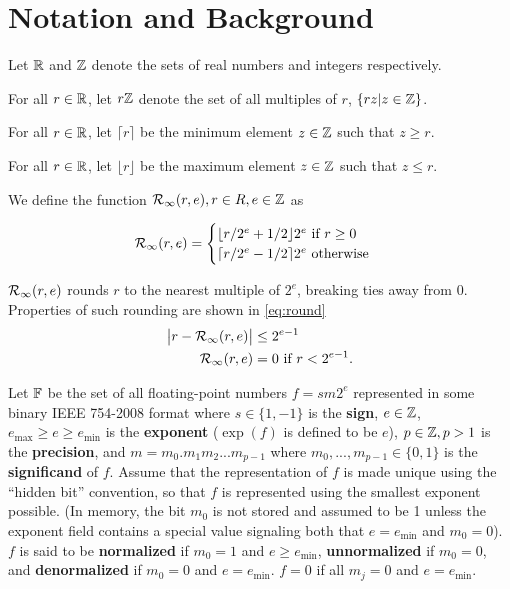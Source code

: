 \section{Notation and Background}
  Let $\mathbb{R}$ and $\mathbb{Z}$ denote the sets of real numbers and integers respectively.

  For all $r \in \mathbb{R}$, let $r\mathbb{Z}$ denote the set of all multiples of $r$, $\{rz | z \in \mathbb{Z}\}$.

  For all $r \in \mathbb{R}$, let $\lceil r \rceil$ be the minimum element $z \in \mathbb{Z}$
  such that $z \geq r$.

  For all $r \in \mathbb{R}$, let $\lfloor r \rfloor$ be the maximum element $z \in \mathbb{Z}$
  such that $z \leq r$.

  We define the function $\mathcal{R}_\text{$\infty$}(r, e), r \in R, e \in \mathbb{Z}$ as

  \begin{equation}
    \mathcal{R}_\text{$\infty$}(r, e) = \begin{cases}
        \lfloor r/2^e + 1/2 \rfloor 2^e \text{ if } r \geq 0\\
        \lceil r/2^e - 1/2 \rceil 2^e \text{ otherwise}
    \end{cases}
  \end{equation}

  $\mathcal{R}_\text{$\infty$}(r, e)$ rounds $r$ to the nearest multiple of $2^e$,
  breaking ties away from 0. Properties of such rounding are shown in
  \eqref{eq:round}
  \begin{equation}
    \begin{aligned}
    \bigl|r - \mathcal{R}_\text{$\infty$}(r, e)\bigr| & \leq 2^{e - 1} \\
    \mathcal{R}_\text{$\infty$}(r,e) & = 0 \text{ if } r < 2^{e-1}.
    \end{aligned}
    \label{eq:round}
  \end{equation}

  Let $\mathbb{F}$ be the set of all floating-point numbers $f = sm2^e$ represented in some binary IEEE 754-2008 format \cite{ieee754} where $s \in \{1, -1\}$ is the \textbf{sign},
  $e \in \mathbb{Z}$, $e_{\max} \geq e \geq e_{\min}$ is the \textbf{exponent} ($\exp(f)$ is
  defined to be $e$), $p \in \mathbb{Z}, p > 1$ is the \textbf{precision},
  and $m=m_0.m_1m_2...m_{p-1}$ where $m_0, ..., m_{p - 1} \in \{0, 1\}$ is the
  \textbf{significand} of $f$. Assume that the representation of $f$ is made unique using the ``hidden bit'' convention, so that $f$ is represented using the smallest exponent possible. (In memory, the bit $m_0$ is not stored and assumed to be 1 unless the exponent field contains a special value signaling both that $e = e_{\min}$ and $m_0=0$).
  $f$ is said to be \textbf{normalized} if $m_0 =1$
  and $e \geq e_{\min}$, \textbf{unnormalized} if $m_0 = 0$, and
  \textbf{denormalized} if $m_0 = 0$ and $e = e_{\min}$. $f = 0$ if all $m_j = 0$
  and $e = e_{\min}$.

